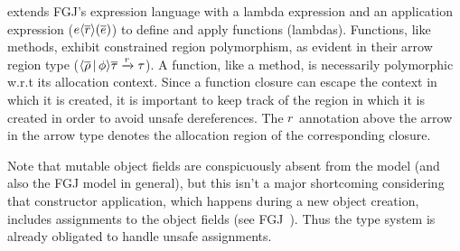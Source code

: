 \FB extends FGJ's expression language with a lambda expression and an
application expression ($e\langle \overline{r} \rangle(\overline{e})$) to define
and apply functions (lambdas). Functions, like methods, exhibit
constrained region polymorphism, as evident in their arrow region type
($\langle \overline{\rho} \,|\, \phi \rangle\overline{\tau} \xrightarrow{r}
\tau$).
A function, like a method, is necessarily polymorphic w.r.t its
allocation context.  Since a function closure can escape the context
in which it is created, it is important to keep track of the region in
which it is created in order to avoid unsafe dereferences. The $r$
annotation above the arrow in the arrow type denotes the allocation
region of the corresponding closure. 

Note that mutable object fields are conspicuously absent from the \FB
model (and also the FGJ model in general), but this isn't a major
shortcoming considering that constructor application, which happens
during a new object creation, includes assignments to the object
fields (see FGJ~\cite{fgj}). Thus the type system is already obligated
to handle unsafe assignments.

